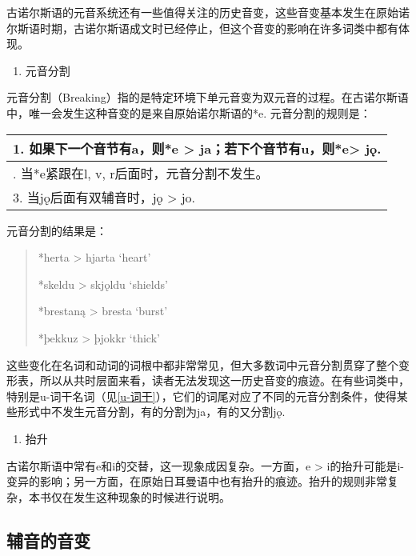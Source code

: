 古诺尔斯语的元音系统还有一些值得关注的历史音变，这些音变基本发生在原始诺尔斯语时期，古诺尔斯语成文时已经停止，但这个音变的影响在许多词类中都有体现。

\begin{enumerate}
  \def\labelenumi{\Alph{enumi}.}
  \setcounter{enumi}{3}
  \item
        元音分割
\end{enumerate}

元音分割（Breaking）指的是特定环境下单元音变为双元音的过程。在古诺尔斯语中，唯一会发生这种音变的是来自原始诺尔斯语的*e. 元音分割的规则是：

\begin{longtable}{l}
  \toprule
  1. 如果下一个音节有a，则*e \textgreater{} ja；若下个音节有u，则*e\textgreater{} jǫ. \\
  \midrule
  \endhead
  \bottomrule
  \endfoot
  2. 当*e紧跟在l, v, r后面时，元音分割不发生。                                        \\
  3. 当jǫ后面有双辅音时，jǫ \textgreater{} jo.                                        \\
\end{longtable}

元音分割的结果是：

\begin{quote}
  *herta \textgreater{} hjarta `heart'

  *skeldu \textgreater{} skjǫldu `shields'

  *brestaną \textgreater{} bresta `burst'

  *þekkuz \textgreater{} þjokkr `thick'
\end{quote}

这些变化在名词和动词的词根中都非常常见，但大多数词中元音分割贯穿了整个变形表，所以从共时层面来看，读者无法发现这一历史音变的痕迹。在有些词类中，特别是u-词干名词（见\ref{u-词干}），它们的词尾对应了不同的元音分割条件，使得某些形式中不发生元音分割，有的分割为ja，有的又分割jǫ.

\begin{enumerate}
  \def\labelenumi{\Alph{enumi}.}
  \setcounter{enumi}{4}
  \item
        抬升
\end{enumerate}

古诺尔斯语中常有e和i的交替，这一现象成因复杂。一方面，e \textgreater{}
i的抬升可能是i-变异的影响；另一方面，在原始日耳曼语中也有抬升的痕迹。抬升的规则非常复杂，本书仅在发生这种现象的时候进行说明。

\subsection{辅音的音变}\label{辅音的音变}


